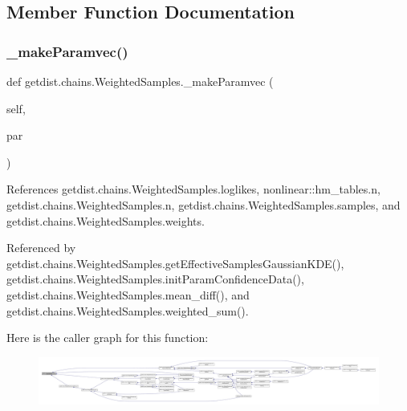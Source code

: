 \subsection{Member Function Documentation}
\mbox{\label{classgetdist_1_1chains_1_1WeightedSamples_a97daf2e7045ad90ef4ff8030b9d65740}} 
\subsubsection{\texorpdfstring{\+\_\+make\+Paramvec()}{\_makeParamvec()}}
{\footnotesize\ttfamily def getdist.\+chains.\+Weighted\+Samples.\+\_\+make\+Paramvec (\begin{DoxyParamCaption}\item[{}]{self,  }\item[{}]{par }\end{DoxyParamCaption})\hspace{0.3cm}{\ttfamily [private]}}



References getdist.\+chains.\+Weighted\+Samples.\+loglikes, nonlinear\+::hm\+\_\+tables.\+n, getdist.\+chains.\+Weighted\+Samples.\+n, getdist.\+chains.\+Weighted\+Samples.\+samples, and getdist.\+chains.\+Weighted\+Samples.\+weights.



Referenced by getdist.\+chains.\+Weighted\+Samples.\+get\+Effective\+Samples\+Gaussian\+K\+D\+E(), getdist.\+chains.\+Weighted\+Samples.\+init\+Param\+Confidence\+Data(), getdist.\+chains.\+Weighted\+Samples.\+mean\+\_\+diff(), and getdist.\+chains.\+Weighted\+Samples.\+weighted\+\_\+sum().

Here is the caller graph for this function\+:
\nopagebreak
\begin{figure}[H]
\begin{center}
\leavevmode
\includegraphics[width=350pt]{classgetdist_1_1chains_1_1WeightedSamples_a97daf2e7045ad90ef4ff8030b9d65740_icgraph}
\end{center}
\end{figure}
\mbox{\label{classgetdist_1_1chains_1_1WeightedSamples_a50c43f2b7f5f0ccd480d227a950a52f1}} 
